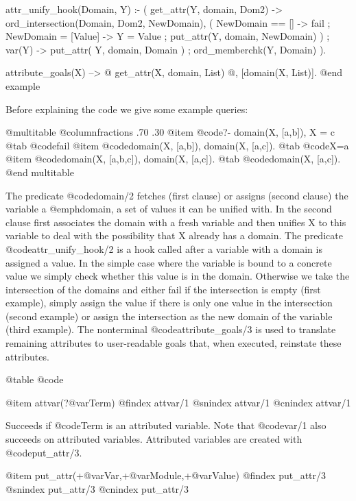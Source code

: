 {{{{{{{{{%

attr_unify_hook(Domain, Y) :-
	(   get_attr(Y, domain, Dom2)
	->  ord_intersection(Domain, Dom2, NewDomain),
	    (   NewDomain == []
	    ->	fail
	    ;	NewDomain = [Value]
	    ->	Y = Value
	    ;	put_attr(Y, domain, NewDomain)
	    )
	;   var(Y)
	->  put_attr( Y, domain, Domain )
	;   ord_memberchk(Y, Domain)
	).


attribute_goals(X) -->
	@{ get_attr(X, domain, List) @},
	[domain(X, List)].
@end example


Before explaining the code we give some example queries:

@multitable @columnfractions .70 .30
            @item @code{?- domain(X, [a,b]), X = c}
@tab @code{fail}
@item @code{domain(X, [a,b]), domain(X, [a,c]).}
           @tab @code{X=a}
    @item @code{domain(X, [a,b,c]), domain(X, [a,c]).}
     @tab @code{domain(X, [a,c]).}
    @end multitable

The predicate @code{domain/2} fetches (first clause) or assigns
(second clause) the variable a @emph{domain}, a set of values it can
be unified with.  In the second clause first associates the domain
with a fresh variable and then unifies X to this variable to deal
with the possibility that X already has a domain. The
predicate @code{attr_unify_hook/2} is a hook called after a variable with
a domain is assigned a value.  In the simple case where the variable
is bound to a concrete value we simply check whether this value is in
the domain. Otherwise we take the intersection of the domains and either
fail if the intersection is empty (first example), simply assign the
value if there is only one value in the intersection (second example) or
assign the intersection as the new domain of the variable (third
example). The nonterminal @code{attribute_goals/3} is used to translate
remaining attributes to user-readable goals that, when executed, reinstate
these attributes.

@table @code

@item attvar(?@var{Term})
@findex attvar/1
@snindex attvar/1
@cnindex attvar/1

Succeeds if @code{Term} is an attributed variable. Note that @code{var/1} also
succeeds on attributed variables.  Attributed variables are created with
@code{put_attr/3}.

@item put_attr(+@var{Var},+@var{Module},+@var{Value})
@findex put_attr/3
@snindex put_attr/3
@cnindex put_attr/3

}}}}}}}}}
